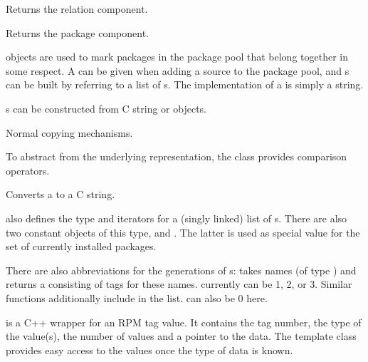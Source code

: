 \documentclass[10pt]{article}
\begin{document}
Returns the relation component.

Returns the package component.




 objects are used to mark packages in the package pool
that belong together in some respect. A  can be given
when adding a source to the package pool, and s can be
built by referring to a list of s. The implementation
of a  is simply a string.

s can be constructed from C string or 
objects.

Normal copying mechanisms.

To abstract from the underlying representation, the class provides
comparison operators.

Converts a  to a C string.

 also defines the type  and
iterators for a (singly linked) list of s. There are
also two constant objects of this type,  and
. The latter is used as special value for the set
of currently installed packages.

There are also abbreviations for the generations of
s:  takes  names
(of type ) and returns a 
consisting of tags for these names.  currently can be 1, 2, or
3. Similar functions  additionally include
 in the list.  can also be 0 here.




 is a C++ wrapper for an RPM tag value. It contains the tag
number, the type of the value(s), the number of values and a pointer
to the data. The  template class provides easy access
to the values once the type of data is known.
\end{document}
